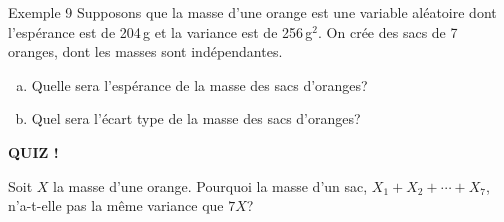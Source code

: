 \documentclass{BeamerTemplate}
\begin{document}
\begin{frame}[t]{Exemple 9}
  Supposons que la masse d'une orange est une variable aléatoire dont
  l'espérance est de 204\,g et la variance est de 256\,g$^2$. On crée des sacs
  de 7 oranges, dont les masses sont indépendantes.

  \begin{enumerate}[a)]\itemsep 2.2cm
    \item Quelle sera l'espérance de la masse des sacs d'oranges?
    \item Quel sera l'écart type de la masse des sacs d'oranges?
  \end{enumerate}
\end{frame}

\begin{frame}[plain,t]
  \centerline{\LARGE\bfseries\alert{QUIZ !}}

  \medskip
  Soit $X$ la masse d'une orange. Pourquoi la masse d'un sac,
  $X_1 + X_2 + \cdots + X_7$, n'a-t-elle \alert{pas} la même variance que
  $7X$?

  \vspace{3cm}
\end{frame}
\end{document}
